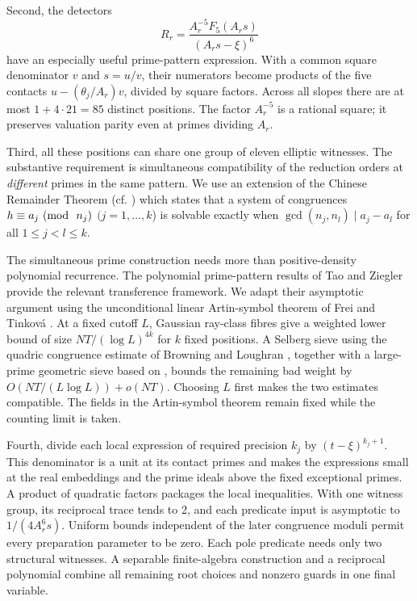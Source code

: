 \documentclass[11pt,reqno]{amsart}
\theoremstyle{definition}
\numberwithin{equation}{section}
\def\mo{{\rm{mod}\ }}
\def\pmod#1{\ (\mo\ #1)}
\def\ls{\leq}
\begin{document}
Second, the detectors
\begin{equation}\label{eq:intromultiplicative}
 R_r=\frac{A_r^{-5}F_5(A_rs)}{(A_rs-\xi)^6}
\end{equation}
have an especially useful prime-pattern expression. With a common square denominator $v$ and $s=u/v$, their numerators become products of the five contacts $u-(\theta_j/A_r)v$, divided by square factors. Across all slopes there are at most $1+4\cdot21=85$ distinct positions. The factor $A_r^{-5}$ is a rational square; it preserves valuation parity even at primes dividing $A_r$.

Third, all these positions can share one group of eleven elliptic witnesses. The substantive requirement is simultaneous compatibility of the reduction orders at \emph{different} primes in the same pattern. 
We use an extension of the Chinese Remainder Theorem (cf. \cite{Sun-book}) which states that a system of congruences $h\equiv a_j\pmod{n_j}$ $(j=1,\ldots,k$) is solvable exactly when $\gcd(n_j,n_l)\mid a_j-a_l$ for all $1\le j<l\ls k$.

The simultaneous prime construction needs more than positive-density polynomial recurrence. The polynomial prime-pattern results of Tao and Ziegler \cite{TZ,TZerr,TZpoly} provide the relevant transference framework. We adapt their asymptotic argument using the unconditional linear Artin-symbol theorem of Frei and Tinkov\'a \cite[Theorem 1.4]{FT}. At a fixed cutoff $L$, Gaussian ray-class fibres give a weighted lower bound of size $NT/(\log L)^{4k}$ for $k$ fixed positions. A Selberg sieve using the quadric congruence estimate of Browning and Loughran \cite{BL}, together with a large-prime geometric sieve based on \cite{BHB}, bounds the remaining bad weight by $O(NT/(L\log L))+o(NT)$. Choosing $L$ first makes the two estimates compatible. The fields in the Artin-symbol theorem remain fixed while the counting limit is taken.

Fourth, divide each local expression of required precision $k_j$ by $(t-\xi)^{k_j+1}$. This denominator is a unit at its contact primes and makes the expressions small at the real embeddings and the prime ideals above the fixed exceptional primes. A product of quadratic factors packages the local inequalities. With one witness group, its reciprocal trace tends to 2, and each predicate input is asymptotic to $1/(4A_r^6s)$. Uniform bounds independent of the later congruence moduli permit every preparation parameter to be zero. Each pole predicate needs only two structural witnesses. A separable finite-algebra construction and a reciprocal polynomial combine all remaining root choices and nonzero guards in one final variable.
\end{document}
